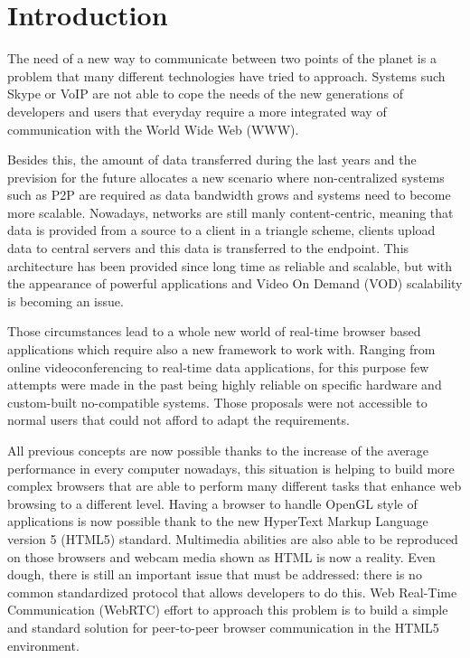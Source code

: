 \section{Introduction}

\thispagestyle{empty}

The need of a new way to communicate between two points of the planet is a problem that many different technologies have tried to approach. Systems such Skype or VoIP are not able to cope the needs of the new generations of developers and users that everyday require a more integrated way of communication with the World Wide Web (WWW). 

Besides this, the amount of data transferred during the last years and the prevision for the future allocates a new scenario where non-centralized systems such as P2P are required as data bandwidth grows and systems need to become more scalable. Nowadays, networks are still manly content-centric, meaning that data is provided from a source to a client in a triangle scheme, clients upload data to central servers and this data is transferred to the endpoint. This architecture has been provided since long time as reliable and scalable, but with the appearance of powerful applications and Video On Demand (VOD) scalability is becoming an issue.

Those circumstances lead to a whole new world of real-time browser based applications which require also a new framework to work with. Ranging from online videoconferencing to real-time data applications, for this purpose few attempts were made in the past being highly reliable on specific hardware and custom-built no-compatible systems. Those proposals were not accessible to normal users that could not afford to adapt the requirements. 

All previous concepts are now possible thanks to the increase of the average performance in every computer nowadays, this situation is helping to build more complex browsers that are able to perform many different tasks that enhance web browsing to a different level. Having a browser to handle OpenGL style of applications is now possible thank to the new  HyperText Markup Language version 5 (HTML5) standard. Multimedia abilities are also able to be reproduced on those browsers and webcam media shown as HTML is now a reality. Even dough, there is still an important issue that must be addressed: there is no common standardized protocol that allows developers to do this. Web Real-Time Communication (WebRTC) effort to approach this problem is to build a simple and standard solution for peer-to-peer browser communication \cite{alvestrandOverview2012} in the HTML5 environment.

